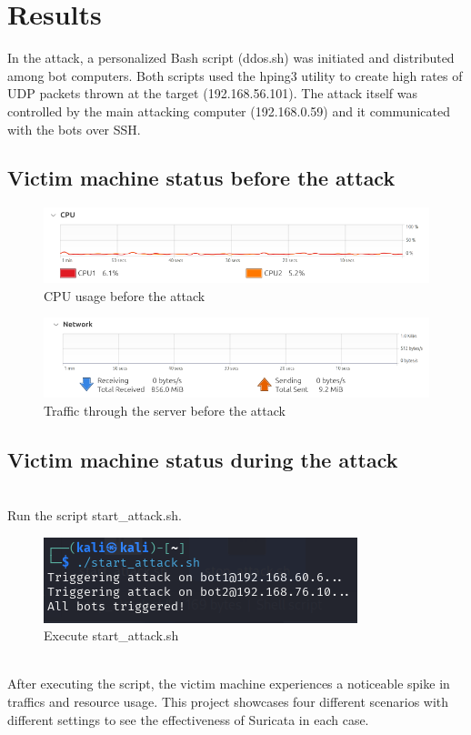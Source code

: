 \chapter{Results}
In the attack, a personalized Bash script (ddos.sh) was initiated and distributed among bot computers. Both scripts used the hping3 utility to create high rates of UDP packets thrown at the target (192.168.56.101). The attack itself was controlled by the main attacking computer (192.168.0.59) and it communicated with the bots over SSH.
\section{Victim machine status before the attack}
\begin{figure}[!htb]
    \centering
    \includegraphics[width=0.8\linewidth]{thesis/cpuBefore.png}
    \caption{CPU usage before the attack}
    \label{fig:enter-label}
\end{figure}
\begin{figure}[!htb]
    \centering
    \includegraphics[width=0.8\linewidth]{thesis/beforeAttack.png}
    \caption{Traffic through the server before the attack}
    \label{fig:enter-label}
\end{figure}
\section{Victim machine status during the attack}
\\Run the script start\_attack.sh.
\begin{figure}[!htb]
    \centering
    \includegraphics[width=0.5\linewidth]{thesis/startAttack.png}
    \caption{Execute start\_attack.sh}
    \label{fig:enter-label}
\end{figure}
\\ After executing the script, the victim machine experiences a noticeable spike in traffics and resource usage. This project showcases four different scenarios with different settings to see the effectiveness of Suricata in each case.
\\
